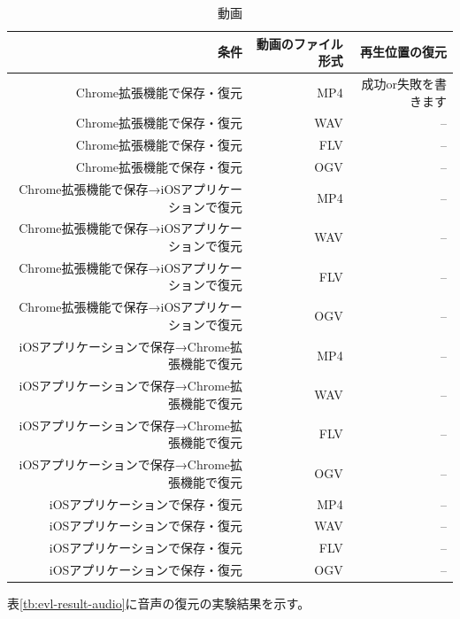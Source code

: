 \begin{table}[htbp]
  \caption{動画}
  \label{tb:evl-result-video}
  \begin{center}
    \begin{tabular}{rrr}
      \hline
      条件 & 動画のファイル形式 & 再生位置の復元 \\ \hline \hline
      Chrome拡張機能で保存・復元 & MP4 & 成功or失敗を書きます  \\ \hline
      Chrome拡張機能で保存・復元 & WAV & --  \\ \hline
      Chrome拡張機能で保存・復元 & FLV & --  \\ \hline
      Chrome拡張機能で保存・復元 & OGV & --  \\ \hline
      Chrome拡張機能で保存→iOSアプリケーションで復元 & MP4 & --  \\ \hline
      Chrome拡張機能で保存→iOSアプリケーションで復元 & WAV & --  \\ \hline
      Chrome拡張機能で保存→iOSアプリケーションで復元 & FLV & --  \\ \hline
      Chrome拡張機能で保存→iOSアプリケーションで復元 & OGV & --  \\ \hline
      iOSアプリケーションで保存→Chrome拡張機能で復元 & MP4 & --  \\ \hline
      iOSアプリケーションで保存→Chrome拡張機能で復元 & WAV & --  \\ \hline
      iOSアプリケーションで保存→Chrome拡張機能で復元 & FLV & --  \\ \hline
      iOSアプリケーションで保存→Chrome拡張機能で復元 & OGV & --  \\ \hline
      iOSアプリケーションで保存・復元 & MP4 & --  \\ \hline
      iOSアプリケーションで保存・復元 & WAV & --  \\ \hline
      iOSアプリケーションで保存・復元 & FLV & --  \\ \hline
      iOSアプリケーションで保存・復元 & OGV & --  \\ \hline
    \end{tabular}
  \end{center}
\end{table}

表\ref{tb:evl-result-audio}に音声の復元の実験結果を示す。

